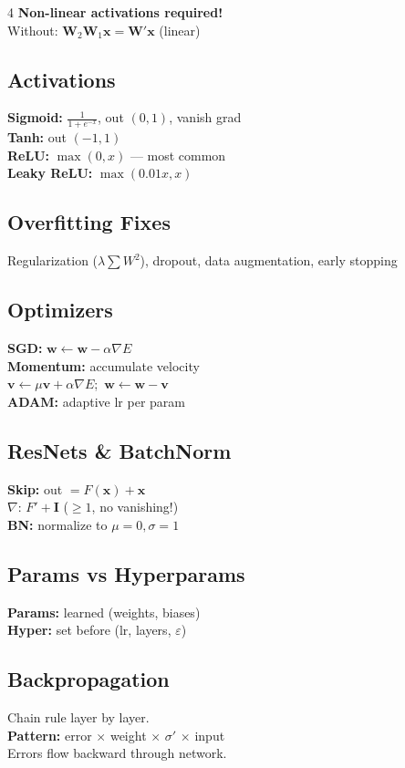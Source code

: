 \documentclass[6pt]{article}
\begin{document}
\begin{multicols}{4}
{\textbf{Non-linear activations required!}\\
Without: $\mathbf{W}_2\mathbf{W}_1\mathbf{x} = \mathbf{W}'\mathbf{x}$ (linear)
}

\subsection{Activations}
\textbf{Sigmoid:} $\frac{1}{1+e^{-x}}$, out $(0,1)$, vanish grad\\
\textbf{Tanh:} out $(-1,1)$\\
\textbf{ReLU:} $\max(0,x)$ --- most common\\
\textbf{Leaky ReLU:} $\max(0.01x,x)$

\subsection{Overfitting Fixes}
Regularization ($\lambda\!\sum\! W^2$), dropout,
data augmentation, early stopping

\subsection{Optimizers}
\textbf{SGD:} $\mathbf{w} \leftarrow \mathbf{w} - \alpha\nabla E$\\
\textbf{Momentum:} accumulate velocity\\
$\mathbf{v} \leftarrow \mu\mathbf{v} + \alpha\nabla E$;\ $\mathbf{w} \leftarrow \mathbf{w} - \mathbf{v}$\\
\textbf{ADAM:} adaptive lr per param

\subsection{ResNets \& BatchNorm}
\textbf{Skip:} out $= F(\mathbf{x}) + \mathbf{x}$\\
$\nabla$: $F' + \mathbf{I}$ ($\geq 1$, no vanishing!)\\
\textbf{BN:} normalize to $\mu\!=\!0,\sigma\!=\!1$

\subsection{Params vs Hyperparams}
\textbf{Params:} learned (weights, biases)\\
\textbf{Hyper:} set before (lr, layers, $\varepsilon$)

\subsection{Backpropagation}
Chain rule layer by layer.\\
\textbf{Pattern:} error $\times$ weight $\times$ $\sigma'$ $\times$ input\\
Errors flow backward through network.


\end{multicols}
\end{document}
